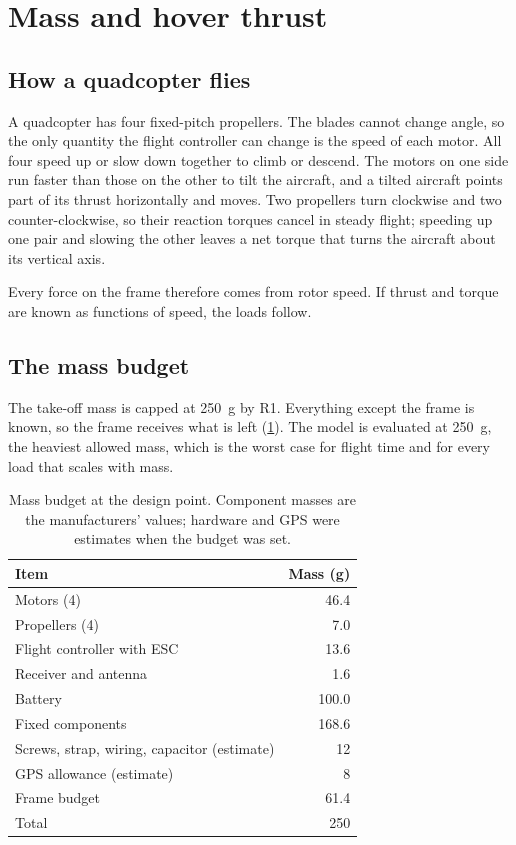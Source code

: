 \section{Mass and hover thrust}\label{sec:sizing-mass}

\subsection{How a quadcopter flies}

A quadcopter has four fixed-pitch propellers. The blades cannot change angle, so the only quantity the flight controller can change is the speed of each motor. All four speed up or slow down together to climb or descend. The motors on one side run faster than those on the other to tilt the aircraft, and a tilted aircraft points part of its thrust horizontally and moves. Two propellers turn clockwise and two counter-clockwise, so their reaction torques cancel in steady flight; speeding up one pair and slowing the other leaves a net torque that turns the aircraft about its vertical axis.

Every force on the frame therefore comes from rotor speed. If thrust and torque are known as functions of speed, the loads follow.

\subsection{The mass budget}

The take-off mass is capped at \SI{250}{g} by R1. Everything except the frame is known, so the frame receives what is left (\cref{tab:sizing-budget}). The model is evaluated at \SI{250}{g}, the heaviest allowed mass, which is the worst case for flight time and for every load that scales with mass.

\begin{table}[htbp]
\centering\small
\caption{Mass budget at the design point. Component masses are the manufacturers' values; hardware and GPS were estimates when the budget was set.}\label{tab:sizing-budget}
\begin{tabular}{@{}lr@{}}
\toprule
Item & Mass (g)\\
\midrule
Motors (4) & 46.4\\
Propellers (4) & 7.0\\
Flight controller with ESC & 13.6\\
Receiver and antenna & 1.6\\
Battery & 100.0\\
\midrule
Fixed components & 168.6\\
Screws, strap, wiring, capacitor (estimate) & 12\\
GPS allowance (estimate) & 8\\
\midrule
Frame budget & 61.4\\
\midrule
Total & 250\\
\bottomrule
\end{tabular}
\end{table}

